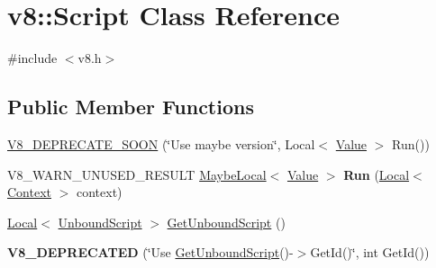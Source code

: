 \hypertarget{classv8_1_1_script}{}\section{v8\+:\+:Script Class Reference}
\label{classv8_1_1_script}


{\ttfamily \#include $<$v8.\+h$>$}

\subsection*{Public Member Functions}
\begin{DoxyCompactItemize}
\item 
\hyperlink{classv8_1_1_script_aea7392a216607dfbf99046475bf09fe2}{V8\+\_\+\+D\+E\+P\+R\+E\+C\+A\+T\+E\+\_\+\+S\+O\+O\+N} (\char`\"{}Use maybe version\char`\"{}, Local$<$ \hyperlink{classv8_1_1_value}{Value} $>$ Run())
\item 
\hypertarget{classv8_1_1_script_a37cfd598569f8b502d568a8a7a5a319b}{}V8\+\_\+\+W\+A\+R\+N\+\_\+\+U\+N\+U\+S\+E\+D\+\_\+\+R\+E\+S\+U\+L\+T \hyperlink{classv8_1_1_maybe_local}{Maybe\+Local}$<$ \hyperlink{classv8_1_1_value}{Value} $>$ {\bfseries Run} (\hyperlink{classv8_1_1_local}{Local}$<$ \hyperlink{classv8_1_1_context}{Context} $>$ context)\label{classv8_1_1_script_a37cfd598569f8b502d568a8a7a5a319b}

\item 
\hyperlink{classv8_1_1_local}{Local}$<$ \hyperlink{classv8_1_1_unbound_script}{Unbound\+Script} $>$ \hyperlink{classv8_1_1_script_afac25cad452a61897c375c2b881e2070}{Get\+Unbound\+Script} ()
\item 
\hypertarget{classv8_1_1_script_a0b781b6966adf4beb558eea17bfd998c}{}{\bfseries V8\+\_\+\+D\+E\+P\+R\+E\+C\+A\+T\+E\+D} (\char`\"{}Use \hyperlink{classv8_1_1_script_afac25cad452a61897c375c2b881e2070}{Get\+Unbound\+Script}()-\/$>$Get\+Id()\char`\"{}, int Get\+Id())\label{classv8_1_1_script_a0b781b6966adf4beb558eea17bfd998c}

\end{DoxyCompactItemize}
